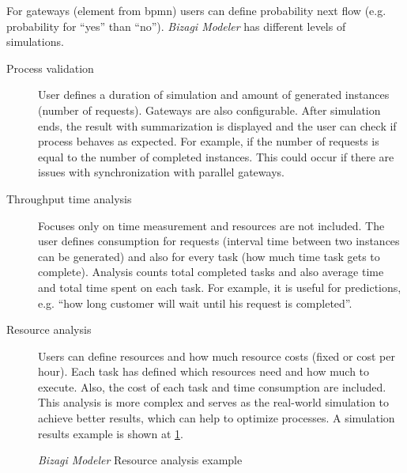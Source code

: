 For gateways (element from \gls{bpmn}) users can define probability next flow (e.g. probability for ``yes'' than ``no''). \textit{Bizagi Modeler} has different levels of simulations.
    \begin{description}
        \item[Process validation] User defines a duration of simulation and amount of generated instances (number of requests). Gateways are also configurable. After simulation ends, the result with summarization is displayed and the user can check if process behaves as expected. For example, if the number of requests is equal to the number of completed instances. This could occur if there are issues with synchronization with parallel gateways.
        \item[Throughput time analysis] Focuses only on time measurement and resources are not included. The user defines consumption for requests (interval time between two instances can be generated) and also for every task (how much time task gets to complete). Analysis counts total completed tasks and also average time and total time spent on each task. For example, it is useful for predictions, e.g. ``how long customer will wait until his request is completed''.
        \item[Resource analysis] Users can define resources and how much resource costs (fixed or cost per hour). Each task has defined which resources need and how much to execute. Also, the cost of each task and time consumption are included. This analysis is more complex and serves as the real-world simulation to achieve better results, which can help to optimize processes. A simulation results example is shown at \cref{fig:bizagi-example}.
    \end{description}

\begin{figure}[ht!]
    \centering
    \qquad
    \caption{\textit{Bizagi Modeler} Resource analysis example\cite{bizagi-2018}}%
    \label{fig:bizagi-example}%
\end{figure}

